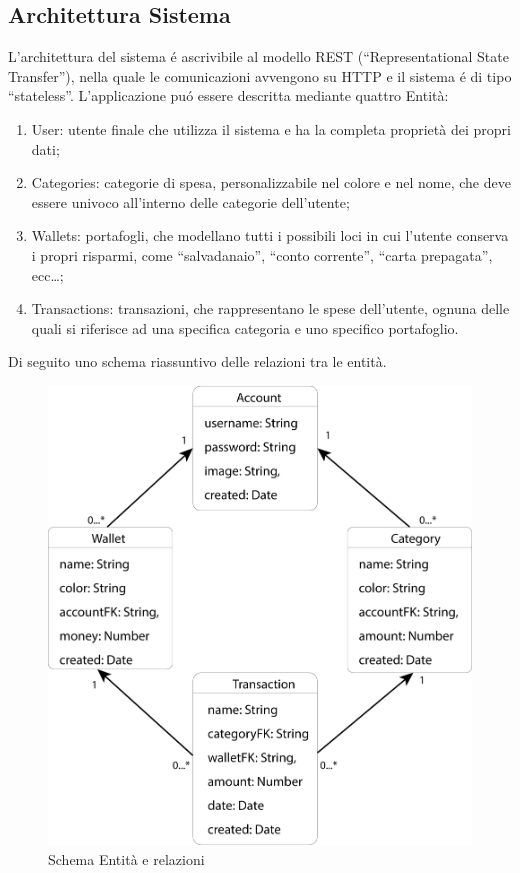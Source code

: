 \documentclass{report}
\begin{document}
\subsection{Architettura Sistema}
L’architettura del sistema é ascrivibile al modello REST (“Representational State Transfer”), nella quale le comunicazioni
avvengono su HTTP e il sistema é di tipo “stateless”.
\newline \newline
L’applicazione puó essere descritta mediante quattro Entità:
\begin{enumerate}
    \item User: utente finale che utilizza il sistema e ha la completa proprietà dei propri dati;
    \item Categories: categorie di spesa, personalizzabile nel colore e nel nome, che deve essere univoco all’interno delle categorie dell’utente;
    \item Wallets: portafogli, che modellano tutti i possibili loci in cui l’utente conserva i propri risparmi, come “salvadanaio”, “conto corrente”, “carta prepagata”, ecc…;
    \item Transactions: transazioni, che rappresentano le spese dell’utente, ognuna delle quali si riferisce ad una specifica categoria e uno specifico portafoglio.
\end{enumerate}
Di seguito uno schema riassuntivo delle relazioni tra le entità.
\begin{figure}[H]
    \centering
    \includegraphics[scale=0.08]{images/UML.png}
    \caption{Schema Entità e relazioni}
\end{figure}
\end{document}
